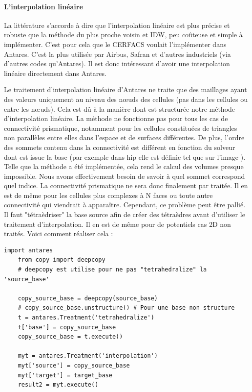 \label{prisme}\paragraph{L'interpolation linéaire}

La littérature \cite{fluidssengineer, palmer2009} s'accorde à dire que l'interpolation linéaire est plus précise et robuste que la méthode du plus proche voisin et IDW, peu coûteuse et simple à implémenter. C'est pour cela que le CERFACS voulait l'implémenter dans Antares. C'est la plus utilisée par Airbus, Safran et d'autres industriels (via d'autres codes qu'Antares). Il est donc intéressant d'avoir une interpolation linéaire directement dans Antares.

Le traitement d'interpolation linéaire d'Antares ne traite que des maillages ayant des valeurs uniquement au niveau des nœuds des cellules (pas dans les cellules ou entre les nœuds). Cela est dû à la manière dont est structurée notre méthode d'interpolation linéaire. %
La méthode ne fonctionne pas pour tous les cas de connectivité prismatique, notamment pour les cellules constituées de triangles non parallèles entre elles dans l'espace et de surfaces différentes. De plus, l'ordre des sommets contenu dans la connectivité est différent en fonction du solveur dont est issue la base (par exemple dans hip elle est définie tel que sur l'image ). Telle que la méthode a été implémentée, cela rend le calcul des volumes presque impossible. Nous avons effectivement besoin de savoir à quel sommet correspond quel indice. La connectivité prismatique ne sera donc finalement par traitée. Il en est de même pour les cellules plus complexes à N faces ou toute autre connectivité qui viendrait à apparaître.
Cependant, ce problème peut être pallié. Il faut "tétraèdriser" la base source afin de créer des tétraèdres avant d'utiliser le traitement d'interpolation. Il en est de même pour de potentiels cas 2D non traités.
Voici comment réaliser cela :

\begin{lstlisting}[caption=Utilisation du traiement "tetrahedralize" pour interpoler linéairement tous types de cellules, label={lst:tet}]
    import antares
    from copy import deepcopy
    # deepcopy est utilise pour ne pas "tetrahedralize" la 'source_base' 
    
    copy_source_base = deepcopy(source_base)
    # copy_source_base.unstructure() # Pour une base non structure
    t = antares.Treatment('tetrahedralize')
    t['base'] = copy_source_base
    copy_source_base = t.execute()

    myt = antares.Treatment('interpolation')
    myt['source'] = copy_source_base
    myt['target'] = target_base
    result2 = myt.execute()
\end{lstlisting}

